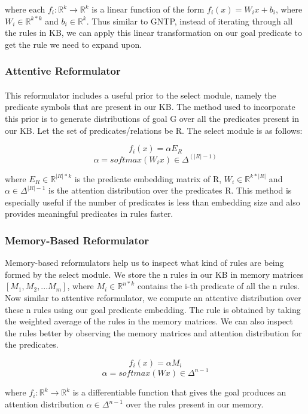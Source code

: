 \documentclass[Other]{iitddiss}
\begin{document}
where each $f_i: \mathbb{R}^k \rightarrow \mathbb{R}^k$ is a linear function of the form $f_i(x) = W_{i}x+b_{i}$, where $W_i \in \mathbb{R}^{k*k} $ and $ b_i \in \mathbb{R}^k$. Thus similar to GNTP, instead of iterating through all the rules in KB, we can apply this linear transformation on our goal predicate to get the rule we need to expand upon.

\subsubsection{Attentive Reformulator}
\paragraph{}
This reformulator includes a useful prior to the select module, namely the predicate symbols that are present in our KB. The method used to incorporate this prior is to generate distributions of goal G over all the predicates present in our KB. Let the set of predicates/relations be R. The select module is as follows:

\[ f_i(x) = \alpha E_R\]
\[\alpha = softmax(W_{i}x) \in \Delta^ {(|R|-1)}\]

where $E_R \in \mathbb{R}^{|R|*k}$ is the predicate embedding matrix of R, $W_i \in \mathbb{R}^{k*|R|}$ and $\alpha \in \Delta^{|R|-1}$ is the attention distribution over the predicates R. This method is especially useful if the number of predicates is less than embedding size and also provides meaningful predicates in rules faster.


\subsubsection{Memory-Based Reformulator}
Memory-based reformulators help us to inspect what kind of rules are being formed by the select module. We store the n rules in our KB in memory matrices $[M_1, M_2, ... M_m]$, where $M_i \in \mathbb{R}^{n*k}$ contains the i-th predicate of all the n rules. Now similar to attentive reformulator, we compute an attentive distribution over these n rules using our goal predicate embedding. The rule is obtained by taking the weighted average of the rules in the memory matrices. We can also inspect the rules better by observing the memory matrices and attention distribution for the predicates.

\[ f_i(x) = \alpha M_i\]
\[ \alpha = softmax(Wx) \in \Delta^{n-1}\]

where $f_i: \mathbb{R}^k \rightarrow \mathbb{R}^k$ is a differentiable function that gives the goal produces an attention distribution $\alpha \in \Delta^{n-1}$ over the rules present in our memory.
\end{document}
